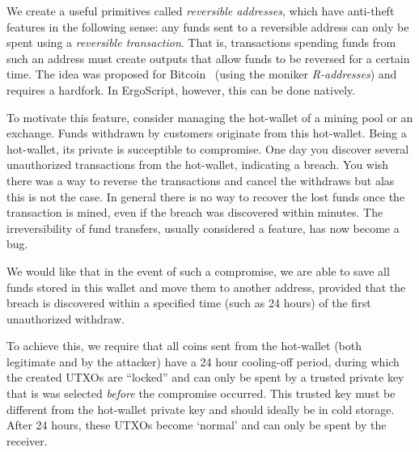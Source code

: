 \documentclass[11pt]{article}
\newcommand{\langname}{ErgoScript\xspace}
\begin{document}
We create a useful primitives called {\em reversible addresses}, which have anti-theft features in the following sense:
any funds sent to a reversible address can only be spent using a {\em reversible transaction}. That is, transactions spending funds from such an address must create outputs that allow funds to be reversed for a certain time. The idea was proposed for Bitcoin~\cite{raddress} (using the moniker {\em R-addresses}) and requires a hardfork. In \langname, however, this can be done natively.

To motivate this feature, consider managing the hot-wallet of a mining pool or an exchange. Funds withdrawn by customers originate from this hot-wallet. Being a hot-wallet, its private is succeptible to compromise. One day you discover several unauthorized transactions from the hot-wallet, indicating a breach. You wish there was a way to reverse the transactions and cancel the withdraws but alas this is not the case. In general there is no way to recover the lost funds once the transaction is mined, even if the breach was discovered within minutes. The irreversibility of fund transfers, usually considered a feature, has now become a bug.

We would like that in the event of such a compromise, we are able to save all funds stored in this wallet and move them to another address, provided that the breach is discovered within a specified time (such as 24 hours) of the first unauthorized withdraw. 

To achieve this, we require that all coins sent from the hot-wallet (both legitimate and by the attacker)
have a 24 hour cooling-off period, during which the created UTXOs are ``locked'' and can only be spent by a trusted private key that is was selected {\em before} the compromise occurred. This trusted key must be different from the hot-wallet private key and should ideally be in cold storage. 
After 24 hours, these UTXOs become `normal' and can only be spent by the receiver.
\end{document}
